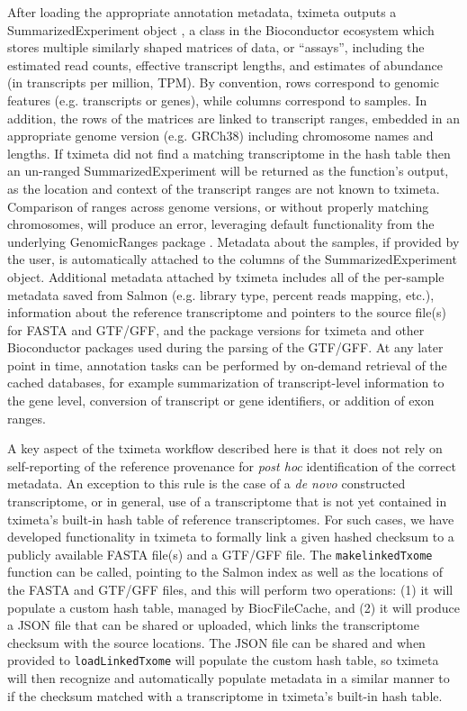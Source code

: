 \documentclass[12pt]{article} \usepackage[utf8]{inputenc}
\begin{document}
After loading the appropriate annotation metadata, tximeta outputs a
SummarizedExperiment object \citep{granges}, a class in the
Bioconductor ecosystem which stores multiple similarly shaped matrices
of data, or ``assays'', including the estimated read counts, effective
transcript lengths, and estimates of abundance (in transcripts per
million, TPM). By convention, rows correspond to genomic features
(e.g. transcripts or genes), while columns correspond to samples. In
addition, the rows of the matrices are linked to transcript ranges,
embedded in an appropriate genome version (e.g. GRCh38) including
chromosome names and lengths. If tximeta did not find a matching
transcriptome in the hash table then an un-ranged SummarizedExperiment
will be returned as the function's output, as the location and context
of the transcript ranges are not known to tximeta. Comparison of
ranges across genome versions, or without properly matching
chromosomes, will produce an error, leveraging default functionality
from the underlying GenomicRanges package \citep{granges}. Metadata
about the samples, if provided by the user, is automatically attached
to the columns of the SummarizedExperiment object. Additional metadata
attached by tximeta includes all of the per-sample metadata saved from
Salmon (e.g. library type, percent reads mapping, etc.), information
about the reference transcriptome and pointers to the source file(s)
for FASTA and GTF/GFF, and the package versions for tximeta and other
Bioconductor packages used during the parsing of the GTF/GFF. At any
later point in time, annotation tasks can be performed by on-demand
retrieval of the cached databases, for example summarization of
transcript-level information to the gene level, conversion of
transcript or gene identifiers, or addition of exon ranges.

A key aspect of the tximeta workflow described here is that it does
not rely on self-reporting of the reference provenance for
\textit{post hoc} identification of the correct metadata. An exception
to this rule is the case of a \textit{de novo} constructed
transcriptome, or in general, use of a transcriptome that is not yet
contained in tximeta's built-in hash table of reference
transcriptomes. For such cases, we have developed functionality in
tximeta to formally link a given hashed checksum to a publicly
available FASTA file(s) and a GTF/GFF file. The
\texttt{makelinkedTxome} function can be called, pointing to the
Salmon index as well as the locations of the FASTA and GTF/GFF files, and
this will perform two operations: (1) it will populate a custom hash
table, managed by BiocFileCache, and (2) it will produce a JSON file
that can be shared or uploaded, which links the transcriptome checksum
with the source locations. The JSON file can be shared and when
provided to \texttt{loadLinkedTxome} will populate the custom hash
table, so tximeta will then recognize and automatically populate
metadata in a similar manner to if the checksum matched with a
transcriptome in tximeta's built-in hash table.
\end{document}
